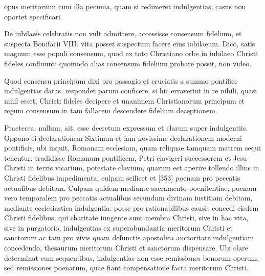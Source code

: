 opus meritorium cum illa pecunia, quam si redimeret indulgentias, casus non oportet specificari.

De iubilaeis celebratis non vult admittere, accessisse consensum fidelium, et suspecta Bonifacii VIII. vita posset suspectum facere eius iubilaeum. Dico, satis magnum esse populi consensum, quod ex toto Christiano orbe in iubilaeo Christi fideles confluunt; quomodo alias consensum fidelium probare possit, non video.

Quod consensu principum dixi pro passagio et cruciatis a summo pontifice indulgentias datas, respondet parum conficere, si hic erraverint in re nihili, quasi nihil esset, Christi fideles decipere et unanimem Christianorum principum et regum consensum in tam fallacem descendere fidelium deceptionem.

Praeterea, nullum, ait, esse decretum expressum et clarum super indulgentiis. Oppono ei declarationem Sixtinam et iam novissime declarationem moderni pontificis, ubi inquit, Romanam ecclesiam, quam reliquae tamquam matrem sequi tenentur, tradidisse Romanum pontificem, Petri clavigeri successorem et Jesu Christi in terris vicarium, potestate clavium, quarum est aperire tollendo illius in Christi fidelibus impedimenta, culpam scilicet et [353] poenam pro peccatis actualibus debitam. Culpam quidem mediante sacramento poenitentiae, poenam vero temporalem pro peccatis actualibus secundum divinam iustitiam debitam, mediante ecclesiastica indulgentia: posse pro rationabilibus causis concedi eisdem Christi fidelibus, qui charitate iungente sunt membra Christi, sive in hac vita, sive in purgatorio, indulgentias ex superabundantia meritorum Christi et sanctorum ac tam pro vivis quam defunctis apostolica auctoritate indulgentiam concedendo, thesaurum meritorum Christi et sanctorum dispensare. Ubi clare determinat cum sequentibus, indulgentias non esse remissiones bonorum operum, sed remissiones poenarum, quae fiant compensatione facta meritorum Christi.


